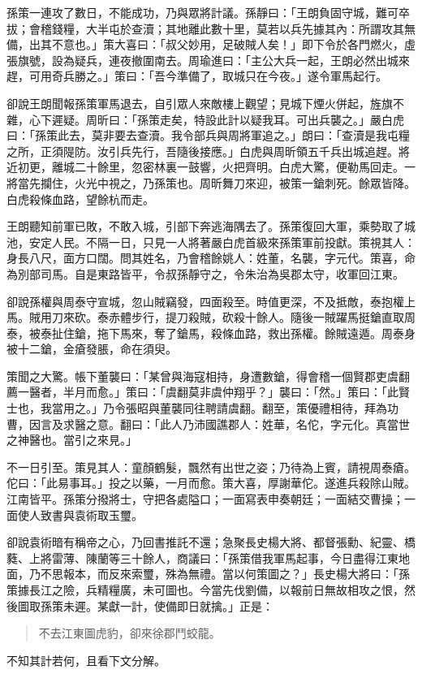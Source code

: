 孫策一連攻了數日，不能成功，乃與眾將計議。孫靜曰：「王朗負固守城，難可卒拔；會稽錢糧，大半屯於查瀆；其地離此數十里，莫若以兵先據其內：所謂攻其無備，出其不意也。」策大喜曰：「叔父妙用，足破賊人矣！」即下令於各門燃火，虛張旗號，設為疑兵，連夜撤圍南去。周瑜進曰：「主公大兵一起，王朗必然出城來趕，可用奇兵勝之。」策曰：「吾今準備了，取城只在今夜。」遂令軍馬起行。

卻說王朗聞報孫策軍馬退去，自引眾人來敵樓上觀望；見城下煙火併起，旌旗不雜，心下遲疑。周昕曰：「孫策走矣，特設此計以疑我耳。可出兵襲之。」嚴白虎曰：「孫策此去，莫非要去查瀆。我令部兵與周將軍追之。」朗曰：「查瀆是我屯糧之所，正須隄防。汝引兵先行，吾隨後接應。」白虎與周昕領五千兵出城追趕。將近初更，離城二十餘里，忽密林裏一鼓響，火把齊明。白虎大驚，便勒馬回走。一將當先攔住，火光中視之，乃孫策也。周昕舞刀來迎，被策一鎗刺死。餘眾皆降。白虎殺條血路，望餘杭而走。

王朗聽知前軍已敗，不敢入城，引部下奔逃海隅去了。孫策復回大軍，乘勢取了城池，安定人民。不隔一日，只見一人將著嚴白虎首級來孫策軍前投獻。策視其人：身長八尺，面方口闊。問其姓名，乃會稽餘姚人：姓董，名襲，字元代。策喜，命為別部司馬。自是東路皆平，令叔孫靜守之，令朱治為吳郡太守，收軍回江東。

卻說孫權與周泰守宣城，忽山賊竊發，四面殺至。時值更深，不及抵敵，泰抱權上馬。賊用刀來砍。泰赤體步行，提刀殺賊，砍殺十餘人。隨後一賊躍馬挺鎗直取周泰，被泰扯住鎗，拖下馬來，奪了鎗馬，殺條血路，救出孫權。餘賊遠遁。周泰身被十二鎗，金瘡發脹，命在須臾。

策聞之大驚。帳下董襲曰：「某曾與海寇相持，身遭數鎗，得會稽一個賢郡吏虞翻薦一醫者，半月而愈。」策曰：「虞翻莫非虞仲翔乎？」襲曰：「然。」策曰：「此賢士也，我當用之。」乃令張昭與董襲同往聘請虞翻。翻至，策優禮相待，拜為功曹，因言及求醫之意。翻曰：「此人乃沛國譙郡人：姓華，名佗，字元化。真當世之神醫也。當引之來見。」

不一日引至。策見其人：童顏鶴髮，飄然有出世之姿；乃待為上賓，請視周泰瘡。佗曰：「此易事耳。」投之以藥，一月而愈。策大喜，厚謝華佗。遂進兵殺除山賊。江南皆平。孫策分撥將士，守把各處隘口；一面寫表申奏朝廷；一面結交曹操；一面使人致書與袁術取玉璽。

卻說袁術暗有稱帝之心，乃回書推託不還；急聚長史楊大將、都督張勳、紀靈、橋蕤、上將雷薄、陳蘭等三十餘人，商議曰：「孫策借我軍馬起事，今日盡得江東地面，乃不思報本，而反來索璽，殊為無禮。當以何策圖之？」長史楊大將曰：「孫策據長江之險，兵精糧廣，未可圖也。今當先伐劉備，以報前日無故相攻之恨，然後圖取孫策未遲。某獻一計，使備即日就擒。」正是：

\begin{quote}
不去江東圖虎豹，卻來徐郡鬥蛟龍。
\end{quote}

不知其計若何，且看下文分解。
